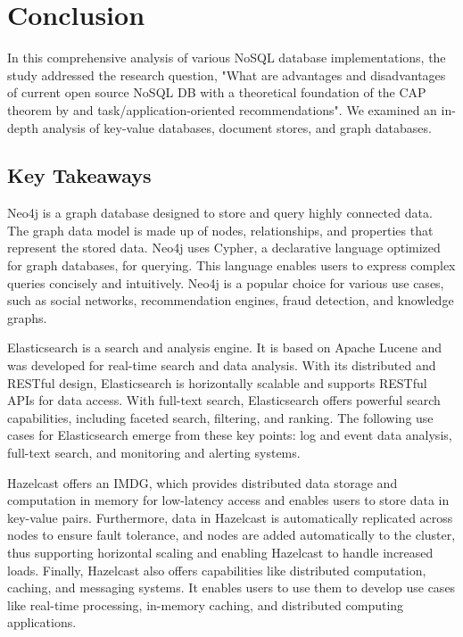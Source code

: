 
\chapter{Conclusion} \label{ch:conclusion}

In this comprehensive analysis of various NoSQL database implementations, the study addressed the research question, "What are advantages and disadvantages of current open source NoSQL DB with a theoretical foundation of the CAP theorem by \textcite{brewer2000towards} and task/application-oriented recommendations". We examined an in-depth analysis of key-value databases, document stores, and graph databases.

\section*{Key Takeaways}

Neo4j is a graph database designed to store and query highly connected data. The graph data model is made up of nodes, relationships, and properties that represent the stored data. Neo4j uses Cypher, a declarative language optimized for graph databases, for querying. This language enables users to express complex queries concisely and intuitively. Neo4j is a popular choice for various use cases, such as social networks, recommendation engines, fraud detection, and knowledge graphs.

Elasticsearch is a search and analysis engine. It is based on Apache Lucene and was developed for real-time search and data analysis. With its distributed and RESTful design, Elasticsearch is horizontally scalable and supports RESTful APIs for data access. With full-text search, Elasticsearch offers powerful search capabilities, including faceted search, filtering, and ranking. The following use cases for Elasticsearch emerge from these key points: log and event data analysis, full-text search, and monitoring and alerting systems.

Hazelcast offers an \ac{IMDG}, which provides distributed data storage and computation in memory for low-latency access and enables users to store data in key-value pairs. Furthermore, data in Hazelcast is automatically replicated across nodes to ensure fault tolerance, and nodes are added automatically to the cluster, thus supporting horizontal scaling and enabling Hazelcast to handle increased loads. Finally, Hazelcast also offers capabilities like distributed computation, caching, and messaging systems. It enables users to use them to develop use cases like real-time processing, in-memory caching, and distributed computing applications.

